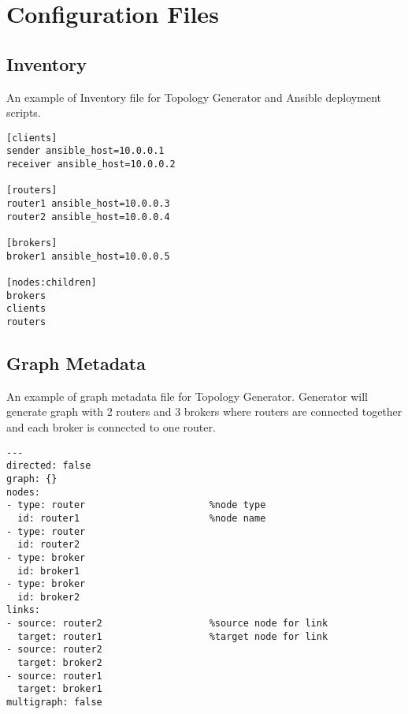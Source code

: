 


\chapter{Configuration Files} %

\section{Inventory}
\label{AP:Inventory}
An example of Inventory file for Topology Generator and Ansible deployment scripts.

\begin{verbatim}
[clients]
sender ansible_host=10.0.0.1					
receiver ansible_host=10.0.0.2

[routers]
router1 ansible_host=10.0.0.3
router2 ansible_host=10.0.0.4

[brokers]
broker1 ansible_host=10.0.0.5

[nodes:children]
brokers
clients
routers
\end{verbatim}

\section{Graph Metadata}
\label{AP:Graph Metadata}
An example of graph metadata file for Topology Generator. Generator will generate graph with 2 routers and 3 brokers where routers are connected together and each broker is connected to one router.

\begin{verbatim}
---
directed: false
graph: {}
nodes:
- type: router						%node type
  id: router1						%node name
- type: router
  id: router2
- type: broker
  id: broker1
- type: broker
  id: broker2
links:
- source: router2					%source node for link
  target: router1					%target node for link
- source: router2
  target: broker2
- source: router1
  target: broker1
multigraph: false
\end{verbatim}

